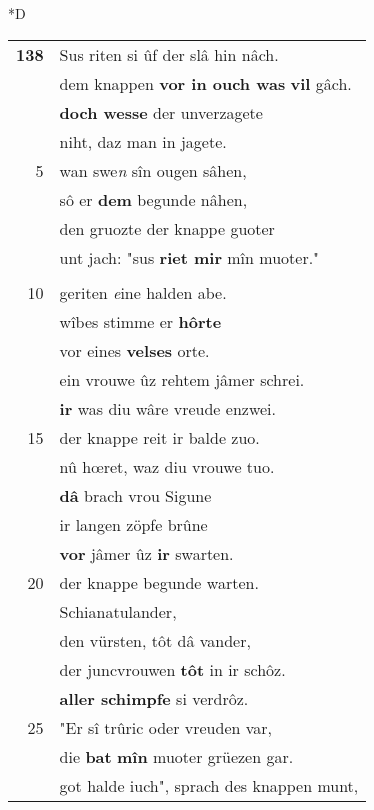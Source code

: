 \documentclass[8pt,a4paper,notitlepage]{article}
\begin{document}
\begin{table}[ht]
\begin{minipage}[t]{0.5\linewidth}
\small
\begin{center}*D
\end{center}
\begin{tabular}{rl}
\textbf{138} & Sus riten si ûf der slâ hin nâch.\\ 
 & dem knappen \textbf{vor in ouch was} \textbf{vil} gâch.\\ 
 & \textbf{doch wesse} der unverzagete\\ 
 & niht, daz man in jagete.\\ 
5 & wan swe\textit{n} sîn ougen sâhen,\\ 
 & sô er \textbf{dem} begunde nâhen,\\ 
 & den gruozte der knappe guoter\\ 
 & unt jach: "sus \textbf{riet mir} mîn muoter."\\ 
 & \textbf{\begin{large}S\end{large}us} kom unser \textbf{tœrscher} knabe\\ 
10 & geriten \textit{e}ine halden abe.\\ 
 & wîbes stimme er \textbf{hôrte}\\ 
 & vor eines \textbf{velses} orte.\\ 
 & ein vrouwe ûz rehtem jâmer schrei.\\ 
 & \textbf{ir} was diu wâre vreude enzwei.\\ 
15 & der knappe reit ir balde zuo.\\ 
 & nû hœret, waz diu vrouwe tuo.\\ 
 & \textbf{dâ} brach vrou Sigune\\ 
 & ir langen zöpfe brûne\\ 
 & \textbf{vor} jâmer ûz \textbf{ir} swarten.\\ 
20 & der knappe begunde warten.\\ 
 & Schianatulander,\\ 
 & den vürsten, tôt dâ vander,\\ 
 & der juncvrouwen \textbf{tôt} in ir schôz.\\ 
 & \textbf{aller schimpfe} si verdrôz.\\ 
25 & "Er sî trûric oder vreuden var,\\ 
 & die \textbf{bat} \textbf{mîn} muoter grüezen gar.\\ 
 & got halde iuch", sprach des knappen munt,\\ 

\end{tabular}
\end{minipage}
\end{table}
\end{document}
